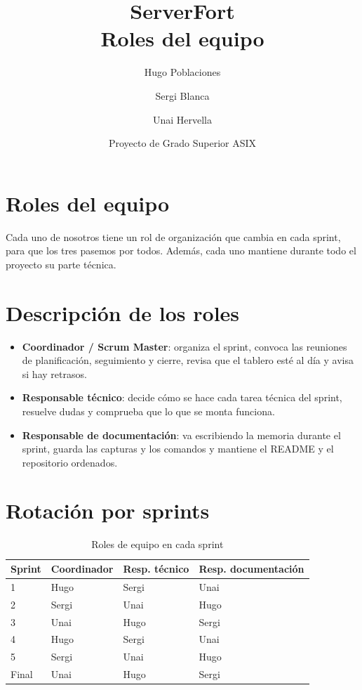 \documentclass[12pt,a4paper]{article}
\title{ServerFort\\[0.2cm]\large Roles del equipo}
\author{Hugo Poblaciones \and Sergi Blanca \and Unai Hervella}
\date{Proyecto de Grado Superior ASIX}
\begin{document}
\maketitle

\section{Roles del equipo}
Cada uno de nosotros tiene un rol de organización que cambia en cada sprint, para que los tres pasemos por todos. Además, cada uno mantiene durante todo el proyecto su parte técnica.

\section{Descripción de los roles}
\begin{itemize}
  \item \textbf{Coordinador / Scrum Master}: organiza el sprint, convoca las reuniones de planificación, seguimiento y cierre, revisa que el tablero esté al día y avisa si hay retrasos.
  \item \textbf{Responsable técnico}: decide cómo se hace cada tarea técnica del sprint, resuelve dudas y comprueba que lo que se monta funciona.
  \item \textbf{Responsable de documentación}: va escribiendo la memoria durante el sprint, guarda las capturas y los comandos y mantiene el README y el repositorio ordenados.
\end{itemize}

\section{Rotación por sprints}
\begin{table}[h]
\centering
\caption{Roles de equipo en cada sprint}
\begin{tabularx}{\textwidth}{@{}lXXX@{}}
\toprule
\textbf{Sprint} & \textbf{Coordinador} & \textbf{Resp. técnico} & \textbf{Resp. documentación} \\
\midrule
1 & Hugo & Sergi & Unai \\
2 & Sergi & Unai & Hugo \\
3 & Unai & Hugo & Sergi \\
4 & Hugo & Sergi & Unai \\
5 & Sergi & Unai & Hugo \\
Final & Unai & Hugo & Sergi \\
\bottomrule
\end{tabularx}
\end{table}
\end{document}
